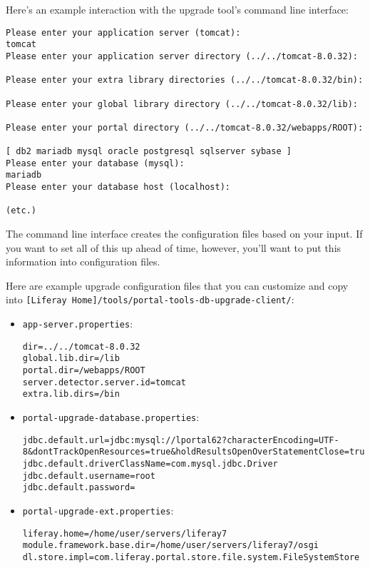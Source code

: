 Here's an example interaction with the upgrade tool's command line
interface:

\begin{verbatim}
Please enter your application server (tomcat):
tomcat
Please enter your application server directory (../../tomcat-8.0.32):

Please enter your extra library directories (../../tomcat-8.0.32/bin):

Please enter your global library directory (../../tomcat-8.0.32/lib):

Please enter your portal directory (../../tomcat-8.0.32/webapps/ROOT):

[ db2 mariadb mysql oracle postgresql sqlserver sybase ]
Please enter your database (mysql):
mariadb
Please enter your database host (localhost):

(etc.)
\end{verbatim}

The command line interface creates the configuration files based on your
input. If you want to set all of this up ahead of time, however, you'll
want to put this information into configuration files.

Here are example upgrade configuration files that you can customize and
copy into
\texttt{{[}Liferay\ Home{]}/tools/portal-tools-db-upgrade-client/}:

\begin{itemize}
\item
  \texttt{app-server.properties}:

\begin{verbatim}
dir=../../tomcat-8.0.32
global.lib.dir=/lib
portal.dir=/webapps/ROOT
server.detector.server.id=tomcat
extra.lib.dirs=/bin
\end{verbatim}
\item
  \texttt{portal-upgrade-database.properties}:

\begin{verbatim}
jdbc.default.url=jdbc:mysql://lportal62?characterEncoding=UTF-8&dontTrackOpenResources=true&holdResultsOpenOverStatementClose=true&useFastDateParsing=false&useUnicode=true
jdbc.default.driverClassName=com.mysql.jdbc.Driver
jdbc.default.username=root
jdbc.default.password=
\end{verbatim}
\item
  \texttt{portal-upgrade-ext.properties}:

\begin{verbatim}
liferay.home=/home/user/servers/liferay7
module.framework.base.dir=/home/user/servers/liferay7/osgi
dl.store.impl=com.liferay.portal.store.file.system.FileSystemStore
\end{verbatim}
\end{itemize}

